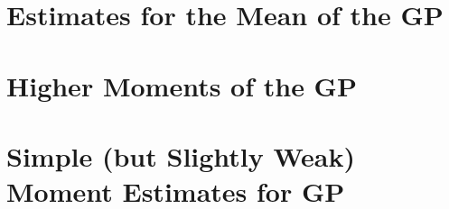 \chapter{Estimates for the Mean of the GP}\label{sec:praos-mean}



\chapter{Higher Moments of the GP}\label{sec:praos-higher-moments}



\chapter{Simple (but Slightly Weak) Moment Estimates for GP}\label{sec:praos-simple-moments}



